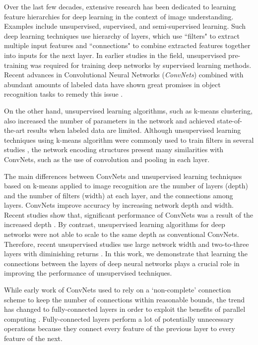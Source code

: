 \documentclass{article} \usepackage{iclr2016_workshop,times}
\begin{document}
Over the last few decades, extensive research has been dedicated to learning feature hierarchies for deep learning in the context of image understanding. Examples include unsupervised, supervised, and semi-supervised learning. Such deep learning techniques use hierarchy of layers, which use ``filters" to extract multiple input features and ``connections" to combine extracted features together into inputs for the next layer.
In earlier studies in the field, unsupervised pre-training was required for training deep networks by supervised learning methods. Recent advances in Convolutional Neural Networks (\textit{ConvNets}) combined with abundant amounts of labeled data have shown great promises in object recognition tasks to remedy this issue \citep{krizhevsky2012imagenet}.

On the other hand, unsupervised learning algorithms, such as k-means clustering, also increased the number of parameters in the network and achieved state-of-the-art results when labeled data are limited.
Although unsupervised learning techniques using k-means algorithm were commonly used to train filters in several studies \citep{coates2011selecting,bo2013unsupervised}, the network encoding structures present many similarities with ConvNets, such as the use of convolution and pooling in each layer.


The main differences between ConvNets and unsupervised learning techniques based on k-means applied to image recognition are the number of layers (depth) and the number of filters (width) at each layer, and the connections among layers. 
ConvNets improve accuracy by increasing network depth and width. Recent studies show that, significant performance of ConvNets was a result of the increased depth \citep{zeiler2014visualizing}.
By contrast, unsupervised learning algorithms for deep networks were not able to scale to the same depth as conventional ConvNets.
Therefore, recent unsupervised studies use large network width and two-to-three layers with diminishing returns \citep{coates2011selecting}.
In this work, we demonstrate that learning the connections between the layers of deep neural networks plays a crucial role in improving the performance of unsupervised techniques.

While early work of ConvNets used to rely on a `non-complete' connection scheme  \citep{lecun1998gradient} to keep the number of connections within reasonable bounds, the trend has changed to fully-connected layers in order to exploit the benefits of parallel computing \citep{krizhevsky2012imagenet, simonyan2014very}.
Fully-connected layers perform a lot of potentially unnecessary operations because they connect every feature of the previous layer to every feature of the next.
\end{document}
